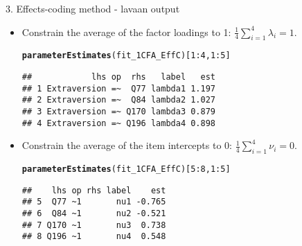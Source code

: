 \documentclass[10pt]{beamer}\usepackage[]{graphicx}\usepackage[]{xcolor}
\makeatletter
\newcommand{\hlnum}[1]{\textcolor[rgb]{0.686,0.059,0.569}{#1}}%
\newcommand{\hlopt}[1]{\textcolor[rgb]{0,0,0}{#1}}%
\newcommand{\hldef}[1]{\textcolor[rgb]{0.345,0.345,0.345}{#1}}%
\newcommand{\hlkwd}[1]{\textcolor[rgb]{0.737,0.353,0.396}{\textbf{#1}}}%
\newenvironment{kframe}{%
 \def\at@end@of@kframe{}%
 \ifinner\ifhmode%
  \def\at@end@of@kframe{\end{minipage}}%
  \begin{minipage}{\columnwidth}%
 \fi\fi%
 \def\FrameCommand##1{\hskip\@totalleftmargin \hskip-\fboxsep
 \colorbox{shadecolor}{##1}\hskip-\fboxsep
     \hskip-\linewidth \hskip-\@totalleftmargin \hskip\columnwidth}%
 \MakeFramed {\advance\hsize-\width
   \@totalleftmargin\z@ \linewidth\hsize
   \@setminipage}}%
 {\par\unskip\endMakeFramed%
 \at@end@of@kframe}
\newenvironment{knitrout}{}{} %
\makeatother
\begin{document}
\begin{frame}[fragile]{3. Effects-coding method - lavaan output}

\begin{itemize}
    \item Constrain the average of the factor loadings to 1:
    $\frac{1}{4} \sum_{i=1}^4 \lambda_i = 1$. \\ %
\begin{knitrout}
\color{fgcolor}\begin{kframe}
\begin{alltt}
\hlkwd{parameterEstimates}\hldef{(fit_1CFA_EffC)[}\hlnum{1}\hlopt{:}\hlnum{4}\hldef{,}\hlnum{1}\hlopt{:}\hlnum{5}\hldef{]}
\end{alltt}
\begin{verbatim}
##            lhs op  rhs   label   est
## 1 Extraversion =~  Q77 lambda1 1.197
## 2 Extraversion =~  Q84 lambda2 1.027
## 3 Extraversion =~ Q170 lambda3 0.879
## 4 Extraversion =~ Q196 lambda4 0.898
\end{verbatim}
\end{kframe}
\end{knitrout}
    \item Constrain the average of the item intercepts to 0:
    $\frac{1}{4} \sum_{i=1}^4 \nu_i = 0$.\\
\begin{knitrout}
\color{fgcolor}\begin{kframe}
\begin{alltt}
\hlkwd{parameterEstimates}\hldef{(fit_1CFA_EffC)[}\hlnum{5}\hlopt{:}\hlnum{8}\hldef{,}\hlnum{1}\hlopt{:}\hlnum{5}\hldef{]}
\end{alltt}
\begin{verbatim}
##    lhs op rhs label    est
## 5  Q77 ~1       nu1 -0.765
## 6  Q84 ~1       nu2 -0.521
## 7 Q170 ~1       nu3  0.738
## 8 Q196 ~1       nu4  0.548
\end{verbatim}
\end{kframe}
\end{knitrout}
\end{itemize}

\end{frame}
%
\end{document}
